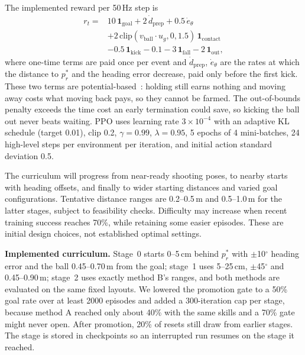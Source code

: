 \documentclass[10pt,twocolumn,letterpaper]{article}
\begin{document}
{\color{blue}The implemented reward per 50\,Hz step is
\begin{equation}
\begin{aligned}
r_t ={}& 10\,\mathbf{1}_{\mathrm{goal}} + 2\,\dot d_{\mathrm{prep}} + 0.5\,\dot e_{\theta}\\
 &+ 2\,\mathrm{clip}(v_{\mathrm{ball}}\!\cdot u_g,0,1.5)\,\mathbf{1}_{\mathrm{contact}}\\
 &- 0.5\,\mathbf{1}_{\mathrm{kick}} - 0.1 - 3\,\mathbf{1}_{\mathrm{fall}} - 2\,\mathbf{1}_{\mathrm{out}},
\end{aligned}
\end{equation}
where one-time terms are paid once per event and $\dot d_{\mathrm{prep}}$, $\dot e_\theta$ are the rates at which the distance to $p_r^*$ and the heading error decrease, paid only before the first kick. These two terms are potential-based~\cite{ng}: holding still earns nothing and moving away costs what moving back pays, so they cannot be farmed. The out-of-bounds penalty exceeds the time cost an early termination could save, so kicking the ball out never beats waiting. PPO uses learning rate $3\times10^{-4}$ with an adaptive KL schedule (target 0.01), clip 0.2, $\gamma=0.99$, $\lambda=0.95$, 5 epochs of 4 mini-batches, 24 high-level steps per environment per iteration, and initial action standard deviation 0.5.\par}

The curriculum will progress from near-ready shooting poses, to nearby starts with heading offsets, and finally to wider starting distances and varied goal configurations. Tentative distance ranges are 0.2--0.5\,m and 0.5--1.0\,m for the latter stages, subject to feasibility checks. Difficulty may increase when recent training success reaches 70\%, while retaining some easier episodes. These are initial design choices, not established optimal settings.

{\color{blue}\textbf{Implemented curriculum.} Stage~0 starts 0--5\,cm behind $p_r^*$ with $\pm$10$^\circ$ heading error and the ball 0.45--0.70\,m from the goal; stage~1 uses 5--25\,cm, $\pm$45$^\circ$ and 0.45--0.90\,m; stage~2 uses exactly method B's ranges, and both methods are evaluated on the same fixed layouts. We lowered the promotion gate to a 50\% goal rate over at least 2000 episodes and added a 300-iteration cap per stage, because method A reached only about 40\% with the same skills and a 70\% gate might never open. After promotion, 20\% of resets still draw from earlier stages. The stage is stored in checkpoints so an interrupted run resumes on the stage it reached.\par}
\end{document}
